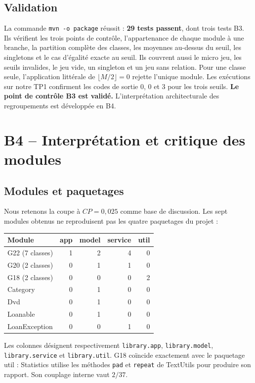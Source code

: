 \documentclass[11pt,a4paper]{article}
\begin{document}
\subsection{Validation}
La commande \texttt{mvn -o package} réussit : \textbf{29 tests passent}, dont
trois tests B3. Ils vérifient les trois points de contrôle, l'appartenance de
chaque module à une branche, la partition complète des classes, les moyennes
au-dessus du seuil, les singletons et le cas d'égalité exacte au seuil.
Ils couvrent aussi le micro jeu, les seuils invalides, le jeu vide, un singleton
et un jeu sans relation. Pour une classe seule, l'application littérale de
$\lfloor M/2\rfloor=0$ rejette l'unique module. Les exécutions sur notre TP1
confirment les codes de sortie 0, 0 et 3 pour les trois seuils.
\textbf{Le point de contrôle B3 est validé.} L'interprétation architecturale
des regroupements est développée en B4.

\section{B4 -- Interprétation et critique des modules}
\subsection{Modules et paquetages}
Nous retenons la coupe à $CP=0{,}025$ comme base de discussion. Les sept modules
obtenus ne reproduisent pas les quatre paquetages du projet :
\begin{center}
\begin{tabular}{lrrrr}
Module & app & model & service & util \\
\hline
G22 (7 classes) & 1 & 2 & 4 & 0 \\
G20 (2 classes) & 0 & 1 & 1 & 0 \\
G18 (2 classes) & 0 & 0 & 0 & 2 \\
Category & 0 & 1 & 0 & 0 \\
Dvd & 0 & 1 & 0 & 0 \\
Loanable & 0 & 1 & 0 & 0 \\
LoanException & 0 & 0 & 1 & 0
\end{tabular}
\end{center}
Les colonnes désignent respectivement \texttt{library.app},
\texttt{library.model}, \texttt{library.service} et \texttt{library.util}.
G18 coïncide exactement avec le paquetage util : Statistics utilise les
méthodes \texttt{pad} et \texttt{repeat} de TextUtils pour produire son rapport.
Son couplage interne vaut $2/37$.
\end{document}
